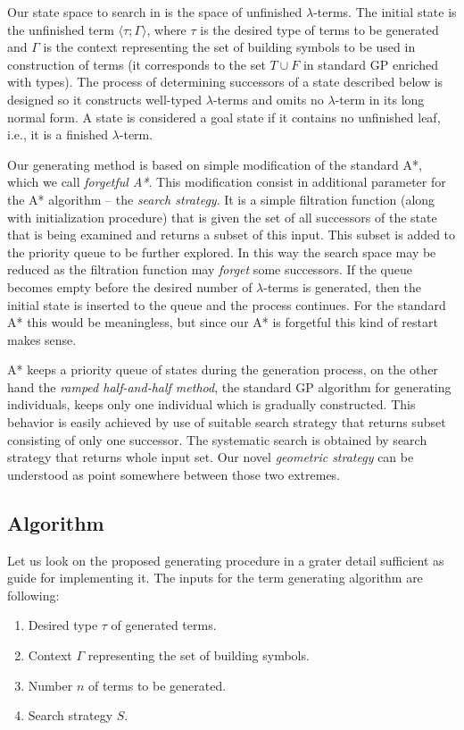 \documentclass[conference]{IEEEtran}
\newcommand{\lterm}{$\lambda$-term\xspace}
\newcommand{\lterms}{$\lambda$-terms\xspace}
\newcommand{\ul}[2]{\langle #1 ; #2 \rangle}
\begin{document}
Our state space to search in is the space of unfinished \lterms. 
The initial state is the unfinished term $\ul{\tau}{\Gamma}$, 
where $\tau$ is the desired type of
terms to be generated and $\Gamma$ is the context
representing the set of building symbols to be used in construction of
terms (it corresponds to the set $T \cup F$ in
standard GP enriched with types). The process of determining 
successors of a state described below is designed so it constructs well-typed 
\lterms and omits no \lterm in its long normal form. 
A state is considered a goal state if it contains no unfinished
leaf, i.e., it is a finished \lterm.

Our generating method is based on simple modification of the
standard A*, which we call \textit{forgetful A*}. This modification consist in 
additional parameter for the A* algorithm -- the \textit{search strategy}. 
It is a simple filtration function (along with initialization procedure)
that is given the set of all successors of the state that is being examined
and returns a subset of this input. This subset is added to the priority queue 
to be further explored. In this way the search space may be reduced as 
the filtration function may \textit{forget} some successors.
If the queue becomes empty before the desired number of \lterms
is generated, then the initial state is inserted to the queue
and the process continues. For the standard A* this would be meaningless,
but since our A* is forgetful this kind of restart makes sense.

A* keeps a priority queue of states during the generation process,
on the other hand the \textit{ramped half-and-half method}, 
the standard GP algorithm for generating individuals, 
keeps only one individual which is gradually constructed. This 
behavior is easily achieved by use of suitable search strategy 
that returns subset consisting of only one successor.
The systematic search is obtained by search strategy that 
returns whole input set.      
Our novel \textit{geometric strategy} can be understood as
point somewhere between those two extremes.

\subsection{Algorithm}

Let us look on the proposed generating procedure in a grater detail sufficient as guide for implementing it.
The inputs for the term generating algorithm are following:
\begin{enumerate}
 \item Desired type $\tau$ of generated terms.
 \item Context $\Gamma$ representing the set of building symbols.
 \item Number $n$ of terms to be generated.
 \item Search strategy $S$. 
\end{enumerate}
\end{document}
